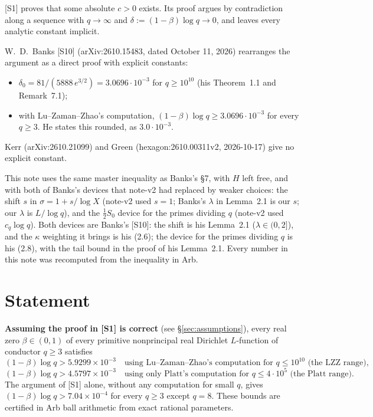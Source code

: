 \documentclass[11pt]{article}
\begin{document}
[S1] proves that some absolute $c>0$ exists. Its proof argues by contradiction along a sequence with $q\to\infty$ and $\delta := (1-\beta)\log q\to 0$, and leaves every analytic constant implicit.

W.~D.~Banks [S10] (arXiv:2610.15483, dated October 11, 2026) rearranges the argument as a direct proof with explicit constants:
\begin{itemize}
\item $\delta_0 = 81/(5888\,e^{3/2}) = 3.0696\cdot 10^{-3}$ for $q\ge 10^{10}$ (his Theorem~1.1 and Remark~7.1);
\item with Lu--Zaman--Zhao's computation, $(1-\beta)\log q\ge 3.0696\cdot10^{-3}$ for every $q\ge 3$. He states this rounded, as $3.0\cdot10^{-3}$.
\end{itemize}
Kerr (arXiv:2610.21099) and Green (hexagon:2610.00311v2, 2026-10-17) give no explicit constant.

This note uses the same master inequality as Banks's \S7, with $H$ left free, and with both of Banks's devices that note-v2 had replaced by weaker choices: the shift $s$ in $\sigma=1+s/\log X$ (note-v2 used $s=1$; Banks's $\lambda$ in Lemma~2.1 is our $s$; our $\lambda$ is $L/\log q$), and the $\frac12S_0$ device for the primes dividing $q$ (note-v2 used $c_q\log q$). Both devices are Banks's [S10]: the shift is his Lemma~2.1 ($\lambda\in(0,2]$), and the $\kappa$ weighting it brings is his (2.6); the device for the primes dividing $q$ is his (2.8), with the tail bound in the proof of his Lemma~2.1. Every number in this note was recomputed from the inequality in Arb.

\section{Statement}

\textbf{Assuming the proof in [S1] is correct} (see \S\ref{sec:assumptions}), every real zero $\beta\in(0,1)$ of every primitive nonprincipal real Dirichlet $L$-function of conductor $q\ge 3$ satisfies
\[
(1-\beta)\log q > 5.9299\times 10^{-3}\quad\text{using Lu--Zaman--Zhao's computation for } q\le 10^{10}\text{ (the LZZ range)},
\]
\[
(1-\beta)\log q > 4.5797\times 10^{-3}\quad\text{using only Platt's computation for } q\le 4\cdot 10^5\text{ (the Platt range).}
\]
The argument of [S1] alone, without any computation for small $q$, gives $(1-\beta)\log q > 7.04\times 10^{-4}$ for every $q\ge 3$ except $q=8$.
These bounds are certified in Arb ball arithmetic from exact rational parameters.
\end{document}

